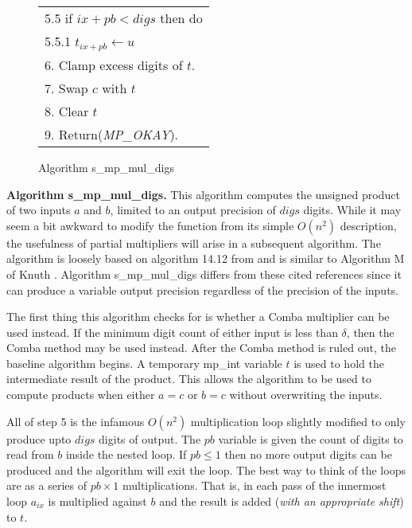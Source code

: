 \documentclass[b5paper]{book}
\begin{document}
\begin{figure}[!here]
\begin{small}
\begin{center}
\begin{tabular}{l}
\hspace{3mm}5.5  if $ix + pb < digs$ then do \\
\hspace{6mm}5.5.1  $t_{ix + pb} \leftarrow u$ \\
6.  Clamp excess digits of $t$. \\
7.  Swap $c$ with $t$ \\
8.  Clear $t$ \\
9.  Return(\textit{MP\_OKAY}). \\
\hline
\end{tabular}
\end{center}
\end{small}
\caption{Algorithm s\_mp\_mul\_digs}
\end{figure}

\textbf{Algorithm s\_mp\_mul\_digs.}
This algorithm computes the unsigned product of two inputs $a$ and $b$, limited to an output precision of $digs$ digits.  While it may seem
a bit awkward to modify the function from its simple $O(n^2)$ description, the usefulness of partial multipliers will arise in a subsequent 
algorithm.  The algorithm is loosely based on algorithm 14.12 from \cite[pp. 595]{HAC} and is similar to Algorithm M of Knuth \cite[pp. 268]{TAOCPV2}.  
Algorithm s\_mp\_mul\_digs differs from these cited references since it can produce a variable output precision regardless of the precision of the 
inputs.

The first thing this algorithm checks for is whether a Comba multiplier can be used instead.   If the minimum digit count of either
input is less than $\delta$, then the Comba method may be used instead.    After the Comba method is ruled out, the baseline algorithm begins.  A 
temporary mp\_int variable $t$ is used to hold the intermediate result of the product.  This allows the algorithm to be used to 
compute products when either $a = c$ or $b = c$ without overwriting the inputs.  

All of step 5 is the infamous $O(n^2)$ multiplication loop slightly modified to only produce upto $digs$ digits of output.  The $pb$ variable
is given the count of digits to read from $b$ inside the nested loop.  If $pb \le 1$ then no more output digits can be produced and the algorithm
will exit the loop.  The best way to think of the loops are as a series of $pb \times 1$ multiplications.    That is, in each pass of the 
innermost loop $a_{ix}$ is multiplied against $b$ and the result is added (\textit{with an appropriate shift}) to $t$.  
\end{document}

